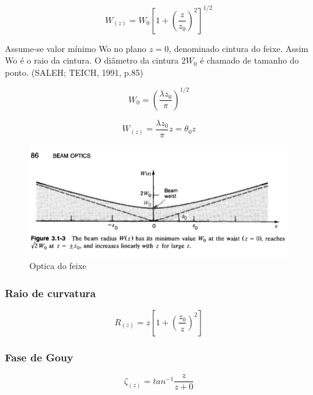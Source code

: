 \documentclass[numeric]{fei}
\begin{document}
\begin{equation}
\label{eq:gaussiano_largura}
W_{(z)} = W_0 \left [ 1 + \left( \frac{z}{z_0} \right ) ^2 \right ] ^{1/2}
\end{equation}

Assume-se valor mínimo Wo no plano $z = 0$, denominado cintura do feixe. Assim Wo é o raio da cintura. O diâmetro da cintura $2W_0$ é chamado de tamanho do ponto. (SALEH; TEICH, 1991, p.85)

\begin{equation}
\label{eq:raio_cintura_1}
W_0 = \left( \frac{\lambda z_0}{\pi} \right)^{1/2}
\end{equation}

\begin{equation}
\label{eq:raio_cintura_2}
W_{(z)} = \frac{\lambda z_0}{\pi} z = \theta_0 z
\end{equation}

\begin{figure}
\centering
\label{beam_optics}
\caption{Optica do feixe}
\includegraphics{beam_optics}
\end{figure}

\subsubsection{Raio de curvatura}

\begin{equation}
\label{eq:raio_curvatura}
R_{(z)} = z \left [ 1 + \left( \frac{z_0}{z} \right ) ^2 \right ]
\end{equation}

\subsubsection{Fase de Gouy}

\begin{equation}
\label{eq:fase_gouy}
\zeta_{(z)} = tan^{-1} \frac{z}{z+0}
\end{equation}
\end{document}

